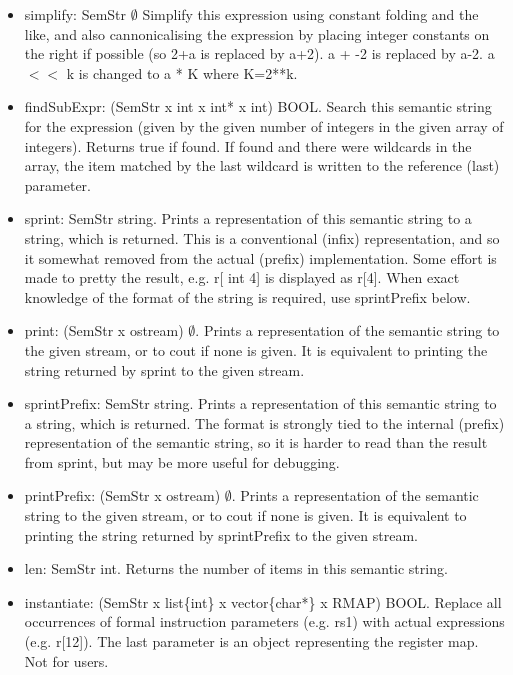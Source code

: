 \begin{itemize}
\item   simplify: SemStr \ra $\emptyset$
    Simplify this expression using constant folding and the like, and also
    cannonicalising the expression by placing integer constants on the
    right if possible (so 2+a is replaced by a+2). a + -2 is replaced by a-2.
    a $<<$ k is changed to a * K where K=2**k.

\item   findSubExpr: (SemStr x int x int* x int) \ra BOOL.
    Search this semantic string for the expression (given by the given number
    of integers in the given array of integers). Returns true if found. If
    found and there were wildcards in the array, the item matched by the last
    wildcard is written to the reference (last) parameter.

\item   sprint: SemStr \ra string.
    Prints a representation of this semantic string to a string, which
    is returned. This is a conventional (infix) representation, and
    so it somewhat removed from the actual (prefix) implementation.
    Some effort is made to pretty the result, e.g. r[ int 4] is
    displayed as r[4].
    When exact knowledge of the format of the string is required, use
    sprintPrefix below.

\item   print: (SemStr x ostream) \ra $\emptyset$.
    Prints a representation of the semantic string to the given stream,
    or to cout if none is given. It is equivalent to printing the string
    returned by sprint to the given stream.

\item   sprintPrefix: SemStr \ra string.
    Prints a representation of this semantic string to a string, which
    is returned. The format is strongly tied to the internal (prefix)
    representation of the semantic string, so it is harder to read than
    the result from sprint, but may be more useful for debugging.

\item   printPrefix: (SemStr x ostream) \ra $\emptyset$.
    Prints a representation of the semantic string to the given stream,
    or to cout if none is given. It is equivalent to printing the string
    returned by sprintPrefix to the given stream.

\item   len: SemStr \ra int.
    Returns the number of items in this semantic string.

\item   instantiate: (SemStr x list\{int\} x vector\{char*\} x RMAP) \ra BOOL.
    Replace all occurrences of formal instruction parameters (e.g. rs1) with
    actual expressions (e.g. r[12]). The last parameter is an object
    representing the register map. Not for users.

\end {itemize}

